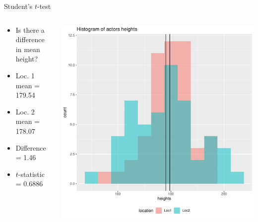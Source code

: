 \documentclass[aspectratio=169]{beamer}\usepackage[]{graphicx}\usepackage[]{color}
\makeatletter
\def\maxwidth{ %
  \ifdim\Gin@nat@width>\linewidth
    \linewidth
  \else
    \Gin@nat@width
  \fi
}
\newenvironment{knitrout}{}{} %
\makeatother
\begin{document}
\begin{frame}[fragile]{Student's $t$-test}
\begin{columns}
  \begin{column}{0.5\textwidth}
  \begin{itemize}
    \item Is there a difference in mean height?
    \item Loc. 1 mean = 179.54
    \item Loc. 2 mean = 178.07
    \item Difference = 1.46
    \item $t$-statistic = 0.6886
  \end{itemize}
  \end{column}
  \begin{column}{0.5\textwidth}
\begin{knitrout}\scriptsize
{}\color{fgcolor}
\includegraphics[width=\maxwidth]{figure/unnamed-chunk-21-1} 

\end{knitrout}
  \end{column}
\end{columns}
\end{frame}
\end{document}
